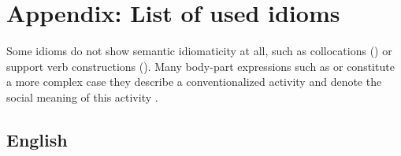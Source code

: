 \documentclass[output=paper]{langsci/langscibook}
\begin{document}
\section*{Appendix: List of used idioms}

Some idioms do not show semantic idiomaticity at all, such as collocations () or support verb constructions (). 
Many body-part expressions such as  or  constitute a more complex case they describe a conventionalized activity and denote the social meaning of this activity \citep{Burger:76}.

\subsection*{English}
\end{document}
